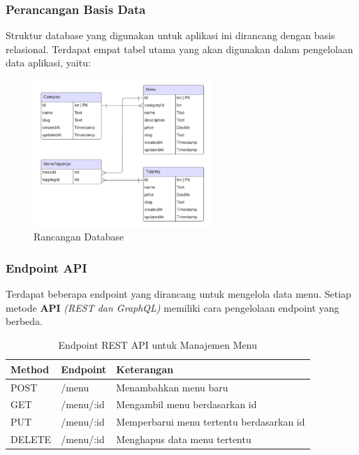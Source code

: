 \documentclass[
 manuscript=article,  %
  layout=publish, 
  year=2024, 
  month= Februari, %
  volume=8,
  number=1 
]{JIKO}
\begin{document}
\subsubsection{Perancangan Basis Data }

Struktur database yang digunakan untuk aplikasi ini dirancang dengan basis relasional. Terdapat empat tabel utama yang akan digunakan dalam pengelolaan data aplikasi, yaitu:

\begin{figure}[ht!]
    \begin{center}
        \includegraphics[width=0.6\textwidth]{assets/Picture2.png}
        \caption{Rancangan Database}
        \label{fig:logo}
    \end{center}
\end{figure}

\subsubsection{Endpoint API}

Terdapat beberapa endpoint yang dirancang untuk mengelola data menu. Setiap metode \textbf{API} \textit{(REST dan GraphQL)} memiliki cara pengelolaan endpoint yang berbeda. 

\begin{table}[hbt!]
	\begin{threeparttable}
		\caption{Endpoint REST API untuk Manajemen Menu}
		\label{tabel:endpointmenu}
		 \begin{tabular}{lll}
			\toprule
			\textbf{Method} & \textbf{Endpoint} & \textbf{Keterangan} \\
			\midrule
			POST & /menu & Menambahkan menu baru \\
			GET & /menu/:id & Mengambil menu berdasarkan id \\
			PUT & /menu/:id & Memperbarui menu tertentu berdasarkan id \\
			DELETE & /menu/:id & Menghapus data menu tertentu \\
			\bottomrule
		\end{tabular}
	\end{threeparttable}
\end{table}
\end{document}

